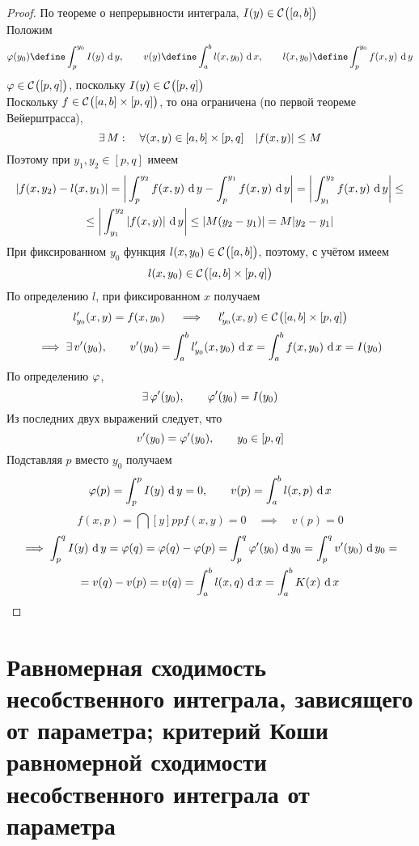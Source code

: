\begin{proof}
	По теореме о непрерывности интеграла, $ I(y) \in \Cont{[a, b]} $ \\
	Положим
	$$ \vphi(y_0) \define \dint[y]{p}{y_0}{I(y)}, \qquad v(y) \define \dint{a}b{l(x, y_0)}, \qquad l(x, y_0) \define \dint[y]{p}{y_0}{f(x, y)} $$
	$ \vphi \in \Cont{[p, q]} $, поскольку $ I(y) \in \Cont{[p, q]} $ \\
	Поскольку $ f \in \Cont{[a, b] \times [p, q]} $, то она ограничена (по первой теореме Вейерштрасса), \ie
	$$ \exist M : \quad \forall (x, y) \in [a, b] \times [p, q] \quad |f(x, y)| \le M $$
	Поэтому при $ y_1, y_2 \in [p, q] $ имеем
	\begin{multline}\lbl{par_int:24}
		|f(x, y_2) - l(x, y_1)| = \bigg| \dint[y]{p}{y_2}{f(x, y)} - \dint[y]{p}{y_1}{f(x, y)} \bigg| = \bigg| \dint[y]{y_1}{y_2}{f(x, y)} \bigg| \le \\
		\le \bigg| \dint[y]{y_1}{y_2}{|f(x, y)|} \bigg| \le |M(y_2 - y_1)| = M|y_2 - y_1|
	\end{multline}
	При фиксированном $ y_0 $ функция $ l(x, y_0) \in \Cont{[a, b]} $, поэтому, с учётом  имеем
	$$ l(x, y_0) \in \Cont{[a, b] \times [p, q]} $$
	По определению $ l $, при фиксированном $ x $ получаем
	$$ l_{y_0}'(x, y) = f(x, y_0) \quad \implies \quad l_{y_0}'(x, y) \in \Cont{[a, b] \times [p, q]} $$
	$$ \implies \exist v'(y_0), \qquad v'(y_0) = \dint{a}b{l_{y_0}'(x, y_0)} = \dint{a}b{f(x, y_0)} = I(y_0) $$
	По определению $ \vphi $,
	$$ \exist \vphi'(y_0), \qquad \vphi'(y_0) = I(y_0) $$
	Из последних двух выражений следует, что
	$$ v'(y_0) = \vphi'(y_0), \qquad y_0 \in [p, q] $$
	Подставляя $ p $ вместо $ y_0 $ получаем
	$$ \vphi(p) = \dint[y]{p}p{I(y)} = 0, \qquad v(p) = \dint{a}b{l(x, p)} $$
	$$ f(x, p) = \dint[y]{p}p{f(x, y)} = 0 \quad \implies \quad v(p) = 0 $$
	\begin{multline*}
		\implies \dint[y]pq{I(y)} = \vphi(q) = \vphi(q) - \vphi(p) = \dint[y_0]pq{\vphi'(y_0)} = \dint[y_0]{p}q{v'(y_0)} = \\
		= v(q) - v(p) = v(q) = \dint{a}b{l(x, q)} = \dint{a}b{K(x)}
	\end{multline*}
\end{proof}

\section{Равномерная сходимость несобственного интеграла, зависящего от параметра; критерий Коши равномерной сходимости несобственного интеграла от параметра}

